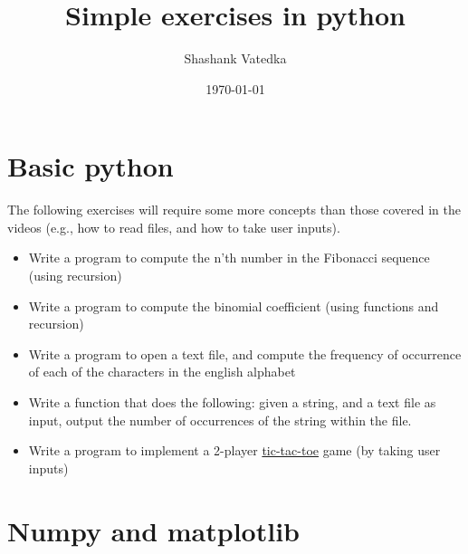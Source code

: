 \documentclass[11pt]{article}
\author{Shashank Vatedka}
\date{\today}
\title{Simple exercises in python}
\begin{document}
\maketitle
\tableofcontents



\section{Basic python}
\label{sec:org67d1718}
The following exercises will require some more concepts than those covered in the videos (e.g., how to read files, and how to take user inputs).
\begin{itemize}
\item Write a program to compute the n'th number in the Fibonacci sequence (using recursion)
\item Write a program to compute the binomial coefficient (using functions and recursion)
\item Write a program to open a text file, and compute the frequency of occurrence of each of the characters in the english alphabet
\item Write a function that does the following: given a string, and a text file as input, output the number of occurrences of the string within the file.
\item Write a program to implement a 2-player \href{https://playtictactoe.org/}{tic-tac-toe} game (by taking user inputs)
\end{itemize}

\section{Numpy and matplotlib}
\label{sec:orgcd89947}
\end{document}
